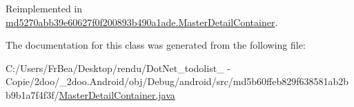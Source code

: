 Reimplemented in \hyperlink{classmd5270abb39e60627f0f200893b490a1ade_1_1_master_detail_container_c49f1f25904383f281279d9ee9f9fba0}{md5270abb39e60627f0f200893b490a1ade.MasterDetailContainer}.

The documentation for this class was generated from the following file:\begin{CompactItemize}
\item 
C:/Users/FrBea/Desktop/rendu/DotNet\_\-todolist\_ - Copie/2doo/\_\-2doo.Android/obj/Debug/android/src/md5b60ffeb829f638581ab2bb9b1a7f4f3f/\hyperlink{md5b60ffeb829f638581ab2bb9b1a7f4f3f_2_master_detail_container_8java}{MasterDetailContainer.java}\end{CompactItemize}
